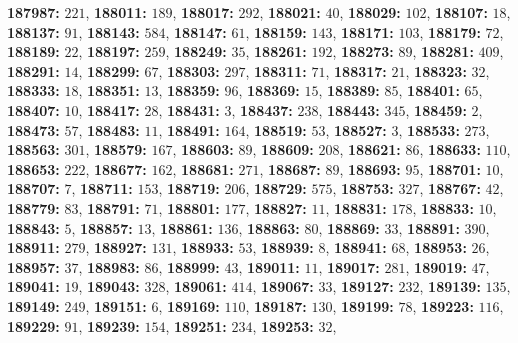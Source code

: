 \textsf{\bfseries 187987:} $221$, \textsf{\bfseries 188011:} $189$, \textsf{\bfseries 188017:} $292$, \textsf{\bfseries 188021:} $40$, \textsf{\bfseries 188029:} $102$, \textsf{\bfseries 188107:} $18$, \textsf{\bfseries 188137:} $91$, \textsf{\bfseries 188143:} $584$, \textsf{\bfseries 188147:} $61$, \textsf{\bfseries 188159:} $143$, \textsf{\bfseries 188171:} $103$, \textsf{\bfseries 188179:} $72$, \textsf{\bfseries 188189:} $22$, \textsf{\bfseries 188197:} $259$, \textsf{\bfseries 188249:} $35$, \textsf{\bfseries 188261:} $192$, \textsf{\bfseries 188273:} $89$, \textsf{\bfseries 188281:} $409$, \textsf{\bfseries 188291:} $14$, \textsf{\bfseries 188299:} $67$, \textsf{\bfseries 188303:} $297$, \textsf{\bfseries 188311:} $71$, \textsf{\bfseries 188317:} $21$, \textsf{\bfseries 188323:} $32$, \textsf{\bfseries 188333:} $18$, \textsf{\bfseries 188351:} $13$, \textsf{\bfseries 188359:} $96$, \textsf{\bfseries 188369:} $15$, \textsf{\bfseries 188389:} $85$, \textsf{\bfseries 188401:} $65$, \textsf{\bfseries 188407:} $10$, \textsf{\bfseries 188417:} $28$, \textsf{\bfseries 188431:} $3$, \textsf{\bfseries 188437:} $238$, \textsf{\bfseries 188443:} $345$, \textsf{\bfseries 188459:} $2$, \textsf{\bfseries 188473:} $57$, \textsf{\bfseries 188483:} $11$, \textsf{\bfseries 188491:} $164$, \textsf{\bfseries 188519:} $53$, \textsf{\bfseries 188527:} $3$, \textsf{\bfseries 188533:} $273$, \textsf{\bfseries 188563:} $301$, \textsf{\bfseries 188579:} $167$, \textsf{\bfseries 188603:} $89$, \textsf{\bfseries 188609:} $208$, \textsf{\bfseries 188621:} $86$, \textsf{\bfseries 188633:} $110$, \textsf{\bfseries 188653:} $222$, \textsf{\bfseries 188677:} $162$, \textsf{\bfseries 188681:} $271$, \textsf{\bfseries 188687:} $89$, \textsf{\bfseries 188693:} $95$, \textsf{\bfseries 188701:} $10$, \textsf{\bfseries 188707:} $7$, \textsf{\bfseries 188711:} $153$, \textsf{\bfseries 188719:} $206$, \textsf{\bfseries 188729:} $575$, \textsf{\bfseries 188753:} $327$, \textsf{\bfseries 188767:} $42$, \textsf{\bfseries 188779:} $83$, \textsf{\bfseries 188791:} $71$, \textsf{\bfseries 188801:} $177$, \textsf{\bfseries 188827:} $11$, \textsf{\bfseries 188831:} $178$, \textsf{\bfseries 188833:} $10$, \textsf{\bfseries 188843:} $5$, \textsf{\bfseries 188857:} $13$, \textsf{\bfseries 188861:} $136$, \textsf{\bfseries 188863:} $80$, \textsf{\bfseries 188869:} $33$, \textsf{\bfseries 188891:} $390$, \textsf{\bfseries 188911:} $279$, \textsf{\bfseries 188927:} $131$, \textsf{\bfseries 188933:} $53$, \textsf{\bfseries 188939:} $8$, \textsf{\bfseries 188941:} $68$, \textsf{\bfseries 188953:} $26$, \textsf{\bfseries 188957:} $37$, \textsf{\bfseries 188983:} $86$, \textsf{\bfseries 188999:} $43$, \textsf{\bfseries 189011:} $11$, \textsf{\bfseries 189017:} $281$, \textsf{\bfseries 189019:} $47$, \textsf{\bfseries 189041:} $19$, \textsf{\bfseries 189043:} $328$, \textsf{\bfseries 189061:} $414$, \textsf{\bfseries 189067:} $33$, \textsf{\bfseries 189127:} $232$, \textsf{\bfseries 189139:} $135$, \textsf{\bfseries 189149:} $249$, \textsf{\bfseries 189151:} $6$, \textsf{\bfseries 189169:} $110$, \textsf{\bfseries 189187:} $130$, \textsf{\bfseries 189199:} $78$, \textsf{\bfseries 189223:} $116$, \textsf{\bfseries 189229:} $91$, \textsf{\bfseries 189239:} $154$, \textsf{\bfseries 189251:} $234$, \textsf{\bfseries 189253:} $32$, 
